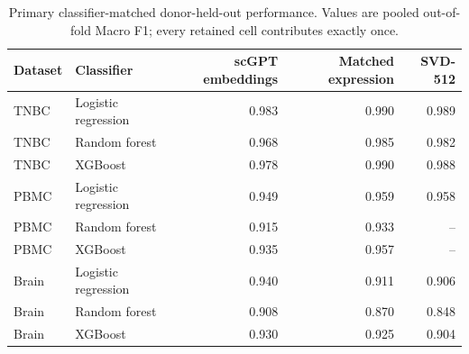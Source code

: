 \begin{table}[H]
\centering
\caption{Primary classifier-matched donor-held-out performance. Values are pooled out-of-fold Macro F1; every retained cell contributes exactly once.}
\label{tab:primary}
\small
\begin{tabular}{llrrr}
\toprule
Dataset & Classifier & scGPT embeddings & Matched expression & SVD-512 \\
\midrule
TNBC & Logistic regression & 0.983 & 0.990 & 0.989 \\
TNBC & Random forest & 0.968 & 0.985 & 0.982 \\
TNBC & XGBoost & 0.978 & 0.990 & 0.988 \\
\addlinespace
PBMC & Logistic regression & 0.949 & 0.959 & 0.958 \\
PBMC & Random forest & 0.915 & 0.933 & -- \\
PBMC & XGBoost & 0.935 & 0.957 & -- \\
\addlinespace
Brain & Logistic regression & 0.940 & 0.911 & 0.906 \\
Brain & Random forest & 0.908 & 0.870 & 0.848 \\
Brain & XGBoost & 0.930 & 0.925 & 0.904 \\
\bottomrule
\end{tabular}
\end{table}
